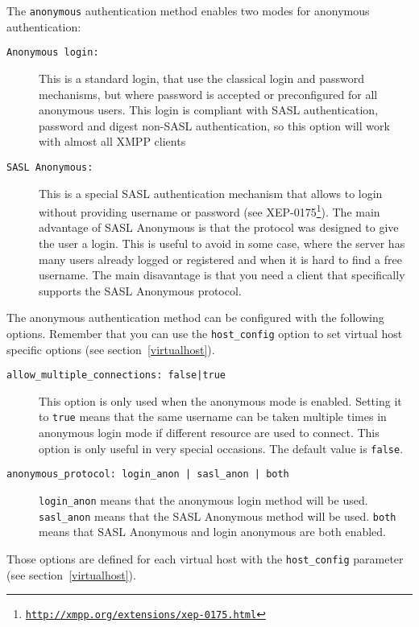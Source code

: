 \documentclass[a4paper,10pt]{book}
\newcommand{\bracehack}{\def\{{\char"7B}\def\}{\char"7D}}
\newcommand{\titem}[1]{\item[\bracehack\texttt{#1}]}
\newcommand{\term}[1]{\texttt{#1}}
\gdef\footahref#1#2{#2\footnote{\href{#1}{\texttt{#1}}}}
\newcommand{\txepref}[2]{\footahref{http://xmpp.org/extensions/xep-#1.html}{#2}}
\newcommand{\xepref}[1]{\txepref{#1}{XEP-#1}}
\begin{document}
The \term{anonymous} authentication method enables two modes for anonymous authentication:
\begin{description}
\titem{Anonymous login:} This is a standard login, that use the
  classical login and password mechanisms, but where password is
  accepted or preconfigured for all anonymous users. This login is
  compliant with SASL authentication, password and digest non-SASL
  authentication, so this option will work with almost all XMPP
  clients

\titem{SASL Anonymous:} This is a special SASL authentication
  mechanism that allows to login without providing username or
  password (see \xepref{0175}).  The main advantage of SASL Anonymous
  is that the protocol was designed to give the user a login. This is
  useful to avoid in some case, where the server has many users
  already logged or registered and when it is hard to find a free
  username. The main disavantage is that you need a client that
  specifically supports the SASL Anonymous protocol.
\end{description}

The anonymous authentication method can be configured with the following
options. Remember that you can use the \term{host\_config} option to set virtual
host specific options (see section~\ref{virtualhost}).

\begin{description}
\titem{allow\_multiple\_connections: false|true} This option is only used
  when the anonymous mode is
  enabled. Setting it to \term{true} means that the same username can be taken
  multiple times in anonymous login mode if different resource are used to
  connect. This option is only useful in very special occasions. The default
  value is \term{false}.
\titem{anonymous\_protocol: login\_anon | sasl\_anon | both}
  \term{login\_anon} means that the anonymous login method will be used.
  \term{sasl\_anon} means that the SASL Anonymous method will be used.
  \term{both} means that SASL Anonymous and login anonymous are both enabled.
\end{description}

Those options are defined for each virtual host with the \term{host\_config}
parameter (see section~\ref{virtualhost}).
\end{document}
